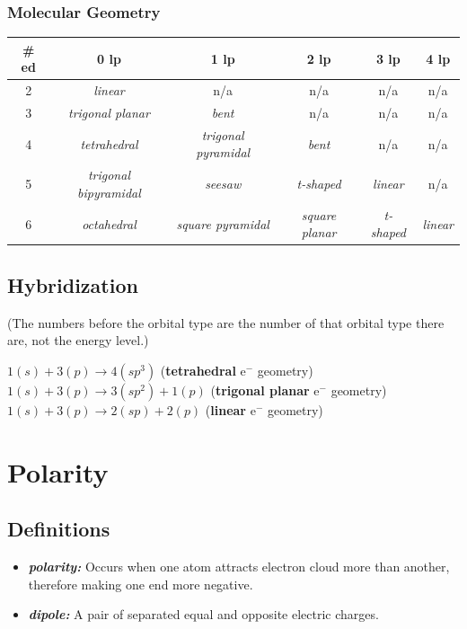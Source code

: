 \documentclass[a4paper, 12pt]{article}
\begin{document}
\subsubsection{Molecular Geometry}
\begin{centering}

\begin{tabular}{c|c|c|c|c|c}
    \textbf{\# ed} & \textbf{0 lp} & \textbf{1 lp} & \textbf{2 lp} & \textbf{3 lp} & \textbf{4 lp} \\\hline
    2 & \textit{linear} & n/a & n/a & n/a & n/a \\
    3 & \textit{trigonal planar} & \textit{bent} & n/a & n/a & n/a \\
    4 & \textit{tetrahedral} & \textit{trigonal pyramidal} & \textit{bent} & n/a & n/a \\
    5 & \textit{trigonal bipyramidal} & \textit{seesaw} & \textit{t-shaped} & \textit{linear} & n/a \\
    6 & \textit{octahedral} & \textit{square pyramidal} & \textit{square planar} & \textit{t-shaped} & \textit{linear}
\end{tabular}

\end{centering}

\subsection{Hybridization}
(The numbers before the orbital type are the number of that orbital type there are, not the energy level.)

$1(s) + 3(p) \xrightarrow{} 4(sp^3)$ (\textbf{tetrahedral} e$^-$ geometry)
\\
$1(s) + 3(p) \xrightarrow{} 3(sp^2) + 1(p)$ (\textbf{trigonal planar} e$^-$ geometry)
\\
$1(s) + 3(p) \xrightarrow{} 2(sp) + 2(p)$ (\textbf{linear} e$^-$ geometry)

\section{Polarity}

\subsection{Definitions}

\begin{itemize}[leftmargin=*, nosep]
    \item \textbf{\textit{polarity:}} Occurs when one atom attracts electron cloud more than another, therefore making one end more negative.
    \item \textbf{\textit{dipole:}} A pair of separated equal and opposite electric charges.
\end{itemize}
\end{document}
